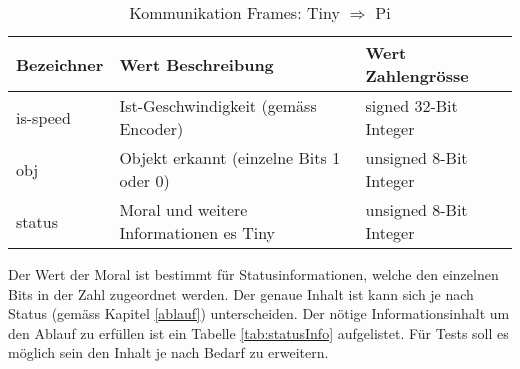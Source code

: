 \documentclass[../../main.tex]{subfiles}
\begin{document}
    \begin{table}[H] \centering
        \begin{tabular}{|l|l|l|}
        \hline
        \textbf{Bezeichner} & \textbf{Wert Beschreibung}                                  & \textbf{Wert Zahlengrösse} \\ \hline
        is-speed            & Ist-Geschwindigkeit (gemäss Encoder)                        & signed 32-Bit Integer      \\ \hline
        obj                 & Objekt erkannt (einzelne Bits 1 oder 0)                     & unsigned 8-Bit Integer     \\ \hline
        status              & Moral und weitere Informationen es Tiny                     & unsigned 8-Bit Integer     \\ \hline
        \end{tabular}

        \caption{Kommunikation Frames: Tiny $\Rightarrow$ Pi}
        \label{tab:com_tiny_pi}
        \end{table}

        Der Wert der Moral ist bestimmt für Statusinformationen, welche den einzelnen Bits in der Zahl zugeordnet werden. Der genaue Inhalt ist kann sich je nach Status (gemäss Kapitel \ref{ablauf}) unterscheiden. Der nötige Informationsinhalt um den Ablauf zu erfüllen ist ein Tabelle \ref{tab:statusInfo} aufgelistet. Für Tests soll es möglich sein den Inhalt je nach Bedarf zu erweitern.
\end{document}

